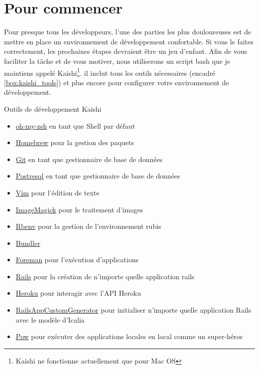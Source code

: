 \documentclass[]{report}
\begin{document}
  \section{Pour commencer}

    Pour presque tous les développeurs, l'une des parties les plus douloureuses est de mettre en place un environnement de développement confortable. Si vous le faites correctement, les prochaines étapes devraient être un jeu d'enfant. Afin de vous faciliter la tâche et de vous motiver, nous utiliserons un script bash que je maintiens appelé Kaishi\footnote{Kaishi ne fonctionne actuellement que pour Mac OS}. il inclut tous les outils nécessaires (encadré \ref{box:kaishi_tools}) et plus encore pour configurer votre environnement de développement.

    \begin{tcolorbox}{Outils de développement Kaishi}\label{box:kaishi_tools}
      \begin{itemize}
        \item \href{https://github.com/robbyrussell/oh-my-zsh}{oh-my-zsh}  en tant que Shell par défaut
        \item \href{http://brew.sh/}{Homebrew} pour la gestion des paquets
        \item \href{http://git-scm.com/}{Git} en tant que gestionnaire de base de données
        \item \href{http://www.postgresql.org/}{Postresql} en tant que gestionnaire de base de données
        \item \href{http://www.vim.org/}{Vim} pour l'édition de texte
        \item \href{http://www.imagemagick.org/}{ImageMagick} pour le traitement d'images
        \item \href{https://github.com/sstephenson/rbenv}{Rbenv} pour la gestion de l'environnement rubis
        \item \href{http://bundler.io/}{Bundler}
        \item \href{https://github.com/ddollar/foreman}{Foreman} pour l'exécution d'applications
        \item \href{http://rubyonrails.org/}{Rails} pour la création de n'importe quelle application rails
        \item \href{https://toolbelt.heroku.com/}{Heroku} pour interagir avec l'API Heroku
        \item \href{https://github.com/IcaliaLabs/railsAppCustomGenerator}{RailsAppCustomGenerator} pour initialiser n'importe quelle application Rails avec le modèle d'Icalia
        \item \href{http://pow.cx/}{Pow} pour exécuter des applications locales en local comme un super-héros
      \end{itemize}
    \end{tcolorbox}
\end{document}
